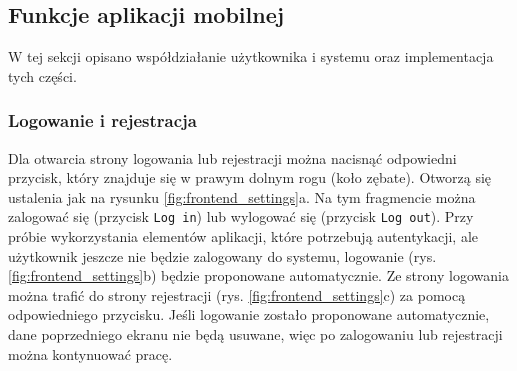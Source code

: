 \subsection{Funkcje aplikacji mobilnej}
W tej sekcji opisano współdziałanie użytkownika i systemu oraz implementacja tych części.

\subsubsection{Logowanie i rejestracja}
Dla otwarcia strony logowania lub rejestracji można nacisnąć odpowiedni przycisk, który znajduje się w prawym dolnym rogu (koło zębate). Otworzą się ustalenia jak na rysunku \ref{fig:frontend_settings}a. Na tym fragmencie można zalogować się (przycisk \texttt{Log in}) lub wylogować się (przycisk \texttt{Log out}).
Przy próbie wykorzystania elementów aplikacji, które potrzebują autentykacji, ale użytkownik jeszcze nie będzie zalogowany do systemu, logowanie (rys. \ref{fig:frontend_settings}b) będzie proponowane automatycznie. Ze strony logowania można trafić do strony rejestracji (rys. \ref{fig:frontend_settings}c) za pomocą odpowiedniego przycisku.
Jeśli logowanie zostało proponowane automatycznie, dane poprzedniego ekranu nie będą usuwane, więc po zalogowaniu lub rejestracji można kontynuować pracę.

